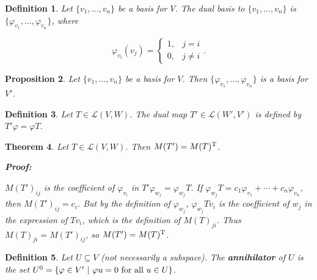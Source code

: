 \documentclass{article}
\theoremstyle{colontheorem}
\newtheorem{theorem}{Theorem}[section]
\newtheorem{proposition}[theorem]{Proposition}
\newtheorem{definition}[theorem]{Definition}
\newenvironment{Theorem}
{
	\begin{mdframed}[backgroundcolor=TheoremOrange!10]
	\begin{theorem}
}
{
	\end{theorem}
	\end{mdframed}
	
	\vspace{.15in}
}
\newenvironment{Proposition}
{
	\begin{mdframed}[backgroundcolor=PropPink!10]
	\begin{proposition}
}
{
	\end{proposition}
	\end{mdframed}
	
	\vspace{.15in}
}
\newenvironment{Def}
{
	\begin{mdframed}[backgroundcolor=DefGreen!10]
	\begin{definition}
}
{
	\end{definition}
	\end{mdframed}
	
	\vspace{.15in}
}
\newenvironment{Proof}
{
	\begin{mdframed}[backgroundcolor=ProofPurple!10]
	\textbf{Proof:}%
}
{
	\end{mdframed}
	
	\vspace{.085in}
}
\begin{document}
\begin{Def}
	
	Let $\{v_1, ..., v_n\}$ be a basis for $V$. The dual basis to $\{v_1, ..., v_n\}$ is $\{\varphi_{v_1}, ..., \varphi_{v_n}\}$, where
	
	$$
	\varphi_{v_i}(v_j) = \begin{cases} 
	1, & j = i \\
	0, & j \neq i
	\end{cases}.
	$$
	
\end{Def}



\begin{Proposition}
	
	Let $\{v_1, ..., v_n\}$ be a basis for $V$. Then $\{\varphi_{v_1}, ..., \varphi_{v_n}\}$ is a basis for $V'$.
	
\end{Proposition}



\begin{Def}
	
	Let $T \in \mathcal{L}(V,W)$. The dual map $T' \in \mathcal{L}(W',V')$ is defined by $T'\varphi = \varphi T$.
	
\end{Def}



\begin{Theorem}
	
	Let $T \in \mathcal{L}(V,W)$. Then $M(T') = M(T)^\textnormal{T}$.
	
	\begin{Proof}
		$M(T')_{ij}$ is the coefficient of $\varphi_{v_i}$ in $T'\varphi_{w_j} = \varphi_{w_j} T$. If $\varphi_{w_j} T = c_1 \varphi_{v_1} + \cdots + c_n \varphi_{v_n}$, then $M(T')_{ij} = c_i$. But by the definition of $\varphi_{w_j}$, $\varphi_{w_j} Tv_i$ is the coefficient of $w_j$ in the expression of $Tv_i$, which is the definition of $M(T)_{ji}$. Thus $M(T)_{ji} = M(T')_{ij}$, so $M(T') = M(T)^\textnormal{T}$.
		
	\end{Proof}
	
\end{Theorem}



\begin{Def}
	
	Let $U \subseteq V$ (not necessarily a subspace). The \textbf{annihilator} of $U$ is the set $U^0 = \{\varphi \in V'\ |\ \varphi u = 0\ \textnormal{for all}\ u \in U\}$.
	
\end{Def}
\end{document}
